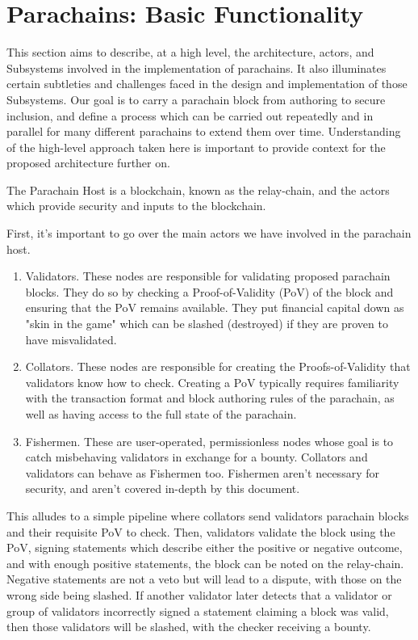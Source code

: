 \section{Parachains: Basic Functionality}

This section aims to describe, at a high level, the architecture, actors, and
Subsystems involved in the implementation of parachains. It also illuminates
certain subtleties and challenges faced in the design and implementation of
those Subsystems. Our goal is to carry a parachain block from authoring to
secure inclusion, and define a process which can be carried out repeatedly and
in parallel for many different parachains to extend them over time.
Understanding of the high-level approach taken here is important to provide
context for the proposed architecture further on.
\newline

The Parachain Host is a blockchain, known as the relay-chain, and the actors
which provide security and inputs to the blockchain.
\newline

First, it's important to go over the main actors we have involved in the
parachain host.
\newline

\begin{enumerate}
    \item Validators. These nodes are responsible for validating proposed
    parachain blocks. They do so by checking a Proof-of-Validity (PoV) of the
    block and ensuring that the PoV remains available. They put financial
    capital down as "skin in the game" which can be slashed (destroyed) if they
    are proven to have misvalidated.
    \item Collators. These nodes are responsible for creating the
    Proofs-of-Validity that validators know how to check. Creating a PoV
    typically requires familiarity with the transaction format and block
    authoring rules of the parachain, as well as having access to the full state
    of the parachain.
    \item Fishermen. These are user-operated, permissionless nodes whose goal is
    to catch misbehaving validators in exchange for a bounty. Collators and
    validators can behave as Fishermen too. Fishermen aren't necessary for
    security, and aren't covered in-depth by this document.
\end{enumerate}

This alludes to a simple pipeline where collators send validators parachain
blocks and their requisite PoV to check. Then, validators validate the block
using the PoV, signing statements which describe either the positive or negative
outcome, and with enough positive statements, the block can be noted on the
relay-chain. Negative statements are not a veto but will lead to a dispute, with
those on the wrong side being slashed. If another validator later detects that a
validator or group of validators incorrectly signed a statement claiming a block
was valid, then those validators will be slashed, with the checker receiving a
bounty.
\newline

